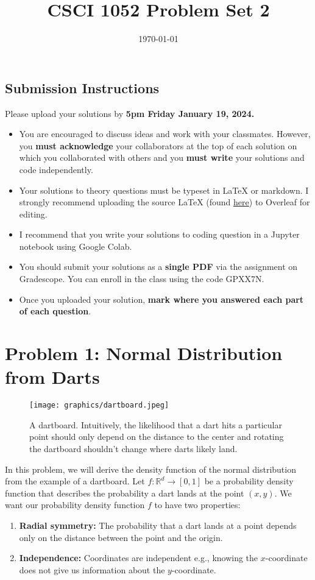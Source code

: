 \documentclass{article}
\title{CSCI 1052 Problem Set 2}
\author{} %
\date{\today}
\begin{document}
\maketitle

\subsection*{Submission Instructions}

Please upload your solutions by
\textbf{5pm Friday January 19, 2024.}
\begin{itemize}
\item You are encouraged to discuss ideas
and work with your classmates. However, you
\textbf{must acknowledge} your collaborators
at the top of each solution on which
you collaborated with others 
and you \textbf{must write} your solutions and code
independently.
\item Your solutions to theory questions must
be typeset in LaTeX or markdown.
I strongly recommend uploading the source LaTeX (found 
\href{https://www.rtealwitter.com/rads2024/psets/pset2.tex}{here})
to Overleaf for editing.
\item I recommend that you write your solutions to coding question in a Jupyter notebook using Google Colab.
\item You should submit your solutions as a \textbf{single PDF} via the assignment on Gradescope. You can enroll in the class using the code GPXX7N.
\item Once you uploaded your solution, \textbf{mark where you answered each part of each question}.
\end{itemize}

\newpage

\section*{Problem 1: Normal Distribution from Darts}

\begin{figure}[h]
	\centering
	\texttt{[image: graphics/dartboard.jpeg]}
	\caption{A dartboard. Intuitively, the likelihood that a dart hits a particular point should only depend on the distance to the center and rotating the dartboard shouldn't change where darts likely land.}
\end{figure}

In this problem, we will derive the density function of the normal distribution from the example of a dartboard.
Let $f: \mathbb{R}^d \to [0,1]$ be a probability density function that describes the probability a dart lands at the point $(x,y)$.
We want our probability density function $f$ to have two properties:
\begin{enumerate}
    \item \textbf{Radial symmetry:} The probability that a dart lands at a point depends only on the distance between the point and the origin.
    \item \textbf{Independence:} Coordinates are independent e.g., knowing the $x$-coordinate does not give us information about the $y$-coordinate.
\end{enumerate}
\end{document}
